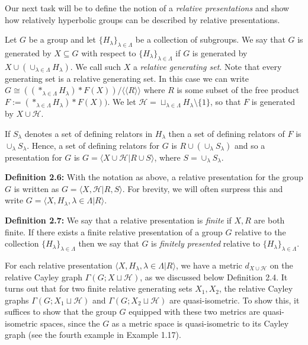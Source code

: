\documentclass[12pt]{article}
\newcommand{\vs}{\vskip10pt}
\begin{document}
	Our next task will be to define the notion of a \textit{relative presentations} and show how relatively hyperbolic groups can be described by relative presentations.
	
	\vs
	
	Let $G$ be a group and let $\{H_{\lambda}\}_{\lambda \in \Lambda}$ be a collection of subgroups. We say that $G$ is generated by $X \subseteq G$ with respect to $\{H_{\lambda}\}_{\lambda \in \Lambda}$ if $G$ is generated by $X \cup (\cup_{\lambda \in \Lambda} H_{\lambda})$. We call such $X$ a \textit{relative generating set}. Note that every generating set is a relative generating set. In this case we can write $G \cong ((*_{\lambda \in \Lambda} H_{\lambda}) * F(X))/\langle \langle R \rangle \rangle$ where $R$ is some subset of the free product $F := (*_{\lambda \in \Lambda} H_{\lambda}) * F(X))$. We let $\mathcal{H} = \sqcup_{\lambda \in \Lambda} H_{\lambda} \setminus \{1\}$, so that $F$ is generated by $X \cup \mathcal{H}$.
	
	\vs 
	
	If $S_{\lambda}$ denotes a set of defining relators in $H_{\lambda}$ then a set of defining relators of $F$ is $\cup_{\lambda} S_{\lambda}$. Hence, a set of defining relators for $G$ is $R \cup (\cup_{\lambda} S_{\lambda})$ and so a presentation for $G$ is $G = \langle X \cup \mathcal{H} \vert R \cup S \rangle$, where $S = \cup_{\lambda} S_{\lambda}$. 
	
	\vs 
	
	\textbf{Definition 2.6: } With the notation as above, a relative presentation for the group $G$ is written as $G = \langle X, \mathcal{H} \vert R, S \rangle$. For brevity, we will often surpress this and write $G = \langle X, H_{\lambda}, \lambda \in \Lambda \vert R \rangle$. 
	
	\vs 
	
	\textbf{Definition 2.7: } We say that a relative presentation is \textit{finite} if $X,R$ are both finite. If there exists a finite relative presentation of a group $G$ relative to the collection $\{H_{\lambda}\}_{\lambda \in \Lambda}$ then we say that $G$ is \textit{finitely presented} relative to $\{H_{\lambda}\}_{\lambda \in \Lambda}$. 
	
	\vs 
	
	For each relative presentation $\langle X, H_{\lambda}, \lambda \in \Lambda \vert R \rangle$, we have a metric $d_{X \cup \mathcal{H}}$ on the relative Cayley graph $\Gamma(G; X \sqcup \mathcal{H})$, as we discussed below Definition 2.4. It turns out that for two finite relative generating sets $X_1, X_2$, the relative Cayley graphs $\Gamma(G; X_1 \sqcup \mathcal{H})$ and $\Gamma(G; X_2 \sqcup \mathcal{H})$ are quasi-isometric. To show this, it suffices to show that the group $G$ equipped with these two metrics are quasi-isometric spaces, since the $G$ as a metric space is quasi-isometric to its Cayley graph (see the fourth example in Example 1.17). 
	
\end{document}
